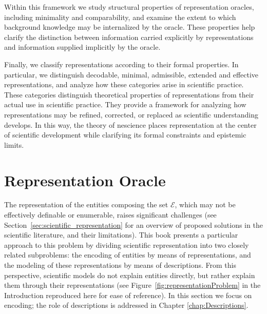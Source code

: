 Within this framework we study structural properties of representation oracles, including minimality and comparability, and examine the extent to which background knowledge may be internalized by the oracle. These properties help clarify the distinction between information carried explicitly by representations and information supplied implicitly by the oracle.

Finally, we classify representations according to their formal properties. In particular, we distinguish decodable, minimal, admissible, extended and effective representations, and analyze how these categories arise in scientific practice. These categories distinguish theoretical properties of representations from their actual use in scientific practice. They provide a framework for analyzing how representations may be refined, corrected, or replaced as scientific understanding develops. In this way, the theory of nescience places representation at the center of scientific development while clarifying its formal constraints and epistemic limits.

%
%

\section{Representation Oracle}

The representation of the entities composing the set $\mathcal{E}$, which may not be effectively definable or enumerable, raises significant challenges (see Section~\ref{sec:scientific_representation} for an overview of proposed solutions in the scientific literature, and their limitations). This book presents a particular approach to this problem by dividing scientific representation into two closely related subproblems: the encoding of entities by means of representations, and the modeling of these representations by means of descriptions. From this perspective, scientific models do not explain entities directly, but rather explain them through their representations (see Figure~\ref{fig:representationProblem} in the Introduction reproduced here for ease of reference). In this section we focus on encoding; the role of descriptions is addressed in Chapter \ref{chap:Descriptions}.

% 

